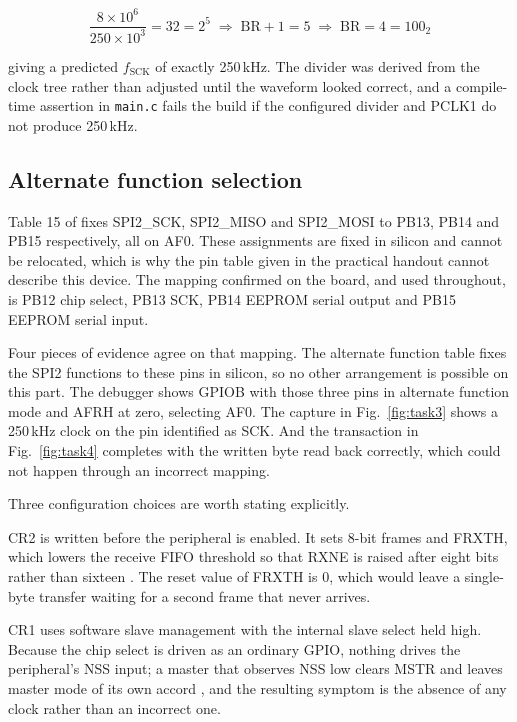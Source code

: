 \documentclass[conference]{IEEEtran}
\begin{document}
\[ \frac{8 \times 10^{6}}{250 \times 10^{3}} = 32 = 2^{5}
   \;\Rightarrow\; \text{BR} + 1 = 5 \;\Rightarrow\; \text{BR} = 4 = 100_2 \]

giving a predicted $f_{\text{SCK}}$ of exactly 250\,kHz. The divider was
derived from the clock tree rather than adjusted until the waveform looked
correct, and a compile-time assertion in \texttt{main.c} fails the build if the
configured divider and PCLK1 do not produce 250\,kHz.

\subsection{Alternate function selection}

Table 15 of \cite{f051ds} fixes SPI2\_SCK, SPI2\_MISO and SPI2\_MOSI to PB13,
PB14 and PB15 respectively, all on AF0. These assignments are fixed in silicon
and cannot be relocated, which is why the pin table given in the practical
handout cannot describe this device. The mapping confirmed on the board, and
used throughout, is PB12 chip select, PB13 SCK, PB14 EEPROM serial output and
PB15 EEPROM serial input.

Four pieces of evidence agree on that mapping. The alternate function table fixes
the SPI2 functions to these pins in silicon, so no other arrangement is possible
on this part. The debugger shows GPIOB with those three pins in alternate
function mode and AFRH at zero, selecting AF0. The capture in
Fig.~\ref{fig:task3} shows a 250\,kHz clock on the pin identified as SCK. And the
transaction in Fig.~\ref{fig:task4} completes with the written byte read back
correctly, which could not happen through an incorrect mapping.

Three configuration choices are worth stating explicitly.

CR2 is written before the peripheral is enabled. It sets 8-bit frames and
FRXTH, which lowers the receive FIFO threshold so that RXNE is raised after
eight bits rather than sixteen \cite{rm0091}. The reset value of FRXTH is 0,
which would leave a single-byte transfer waiting for a second frame that never
arrives.

CR1 uses software slave management with the internal slave select held high.
Because the chip select is driven as an ordinary GPIO, nothing drives the
peripheral's NSS input; a master that observes NSS low clears MSTR and leaves
master mode of its own accord \cite{rm0091}, and the resulting symptom is the
absence of any clock rather than an incorrect one.
\end{document}
